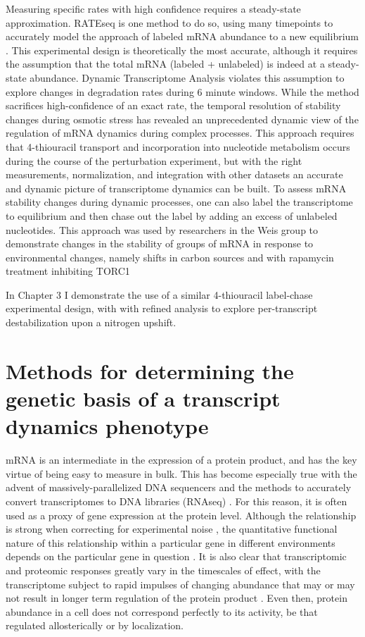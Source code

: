 Measuring specific rates with high confidence
requires a steady-state approximation. RATEseq is one method to do so,
using many timepoints to accurately model the approach of labeled mRNA
abundance to a new equilibrium 
\parencite{neymotin2014determination}. This
experimental design is theoretically the most accurate, although it
requires the assumption that the total mRNA (labeled + unlabeled) is
indeed at a steady-state abundance. Dynamic Transcriptome Analysis
\parencite{miller2011dynamic}
violates this assumption to explore changes in
degradation rates during 6 minute windows. While the method sacrifices
high-confidence of an exact rate, the temporal resolution of stability
changes during osmotic stress has revealed an unprecedented dynamic
view of the regulation of mRNA dynamics during complex processes. This
approach requires that 4-thiouracil transport and incorporation into
nucleotide metabolism occurs during the course of the perturbation
experiment, but with the right measurements, normalization, and
integration with other datasets an accurate and dynamic picture of
transcriptome dynamics can be built. To assess mRNA stability changes
during dynamic processes, one can also label the transcriptome to
equilibrium and then chase out the label by adding an excess of
unlabeled nucleotides. This approach was used by researchers in the
Weis group to demonstrate changes in the stability of groups of mRNA
in response to environmental changes, namely shifts in carbon sources
and with rapamycin treatment inhibiting TORC1
\parencite{munchel2011dynamic}

In Chapter 3 I demonstrate the use of a similar 4-thiouracil
label-chase experimental design, with with refined analysis to 
explore per-transcript destabilization upon a nitrogen upshift.  

\section{Methods for determining the genetic basis of a transcript
dynamics phenotype}

mRNA is an intermediate in the expression of a protein product, and
has the key virtue of being easy to measure in bulk.
This has become especially true with the
advent of massively-parallelized DNA sequencers and the methods to
accurately convert transcriptomes to DNA libraries (RNAseq)
\parencite{shendure2017dna}. For this reason, it is often used as a proxy
of gene expression at the protein level. Although the relationship is
strong when correcting for experimental noise 
\parencite{csardi2015accounting},
the quantitative functional nature of this relationship within a
particular gene in different environments depends on the particular
gene in question 
\parencite{franks2017post}. It is also clear that
transcriptomic and proteomic responses greatly vary in the timescales
of effect, with the transcriptome subject to rapid impulses of
changing abundance that may or may not result in longer term
regulation of the protein product 
\parencite{cheng2016differential,lee2011dynamic}. 
Even then, protein abundance in a cell does not correspond
perfectly to its activity, be that regulated allosterically or by
localization.  

